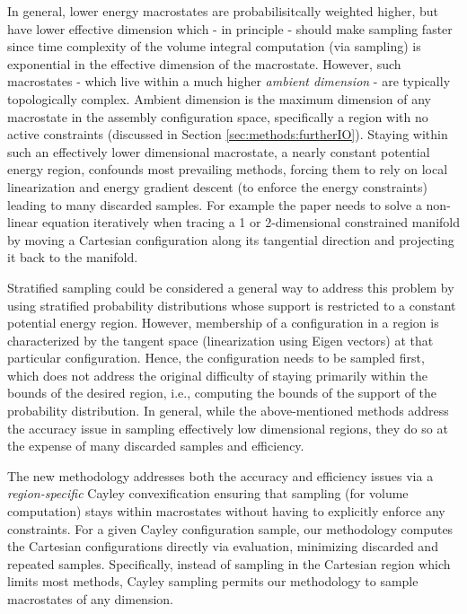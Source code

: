 \documentclass[]{article}
\begin{document}
In general, lower energy macrostates are probabilisitcally weighted higher, but
have lower effective dimension which - in principle - should make sampling
faster since time complexity of the volume integral computation (via sampling)
is exponential in the effective dimension of the macrostate. However, such
macrostates - which live within a much higher \emph{ambient dimension} - are
typically topologically complex. Ambient dimension is the maximum dimension of
any macrostate in the assembly configuration space, specifically a region with
no active constraints (discussed in Section \ref{sec:methods:furtherIO}).
Staying within such an effectively lower dimensional macrostate, a nearly
constant potential energy region, confounds most prevailing methods, forcing
them to rely on local linearization and energy gradient descent (to enforce the
energy constraints) leading to many discarded samples. For example the paper
\cite{Holmes-Cerfon2013} needs to solve a non-linear equation iteratively when
tracing a 1 or 2-dimensional constrained manifold by moving a Cartesian
configuration along its tangential direction and projecting it back to the
manifold. 

Stratified sampling \cite{dinner2017stratification}could be considered a
general way to address this problem by using stratified probability
distributions whose support is restricted to a constant potential energy
region. However, membership of a configuration in a region is characterized by
the tangent space (linearization using Eigen vectors) at that particular
configuration. Hence, the configuration needs to be sampled first, which does
not address the original difficulty of staying primarily within the bounds of
the desired region, i.e., computing the bounds of the support of the
probability distribution. In general, while the above-mentioned methods
address the accuracy issue in sampling effectively low dimensional regions,
they do so at the expense of many discarded samples and efficiency.

The new methodology addresses both the accuracy and efficiency issues via a
\emph{region-specific} Cayley convexification ensuring that sampling (for
volume computation) stays within macrostates without having to explicitly
enforce any constraints. For a given Cayley configuration sample, our
methodology computes the Cartesian configurations directly via evaluation,
minimizing discarded and repeated samples. Specifically, instead of sampling
in the Cartesian region which limits most methods, Cayley sampling permits our
methodology to sample macrostates of any dimension. 
\end{document}
